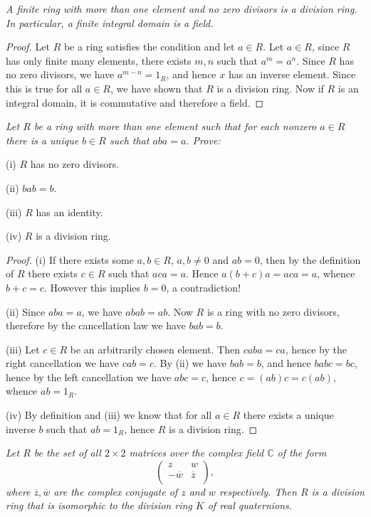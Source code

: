 \begin{problem}\em
A finite ring with more than one element and no zero divisors is a division ring. In particular, a finite integral domain is a field.
\end{problem}
\begin{proof}
Let $R$ be a ring satisfies the condition and let $a\in R$. Let $a\in R$, since $R$ has only finite many elements, there exists $m,n$ such that $a^m=a^n$. Since $R$ has no zero divisors, we have $a^{m-n}=1_R$, and hence $x$ has an inverse element. Since this is true for all $a\in R$, we have shown that $R$ is a division ring. Now if $R$ is an integral domain, it is commutative and therefore a field.
\end{proof}
\begin{problem}\em
Let $R$ be a ring with more than one element such that for each nonzero $a\in R$ there is a unique $b\in R$ such that $aba=a$. Prove:\par
(i) $R$ has no zero divisors.\par
(ii) $bab=b$.\par
(iii) $R$ has an identity.\par
(iv) $R$ is a division ring.
\end{problem}
\begin{proof}
(i) If there exists some $a,b\in R$, $a,b\ne 0$ and $ab=0$, then by the definition of $R$ there exists $c\in R$ such that $aca=a$. Hence $a(b+c)a=aca=a$, whence $b+c=c$. However this implies $b=0$, a contradiction!\par
(ii) Since $aba=a$, we have $abab=ab$. Now $R$ is a ring with no zero divisors, therefore by the cancellation law we have $bab=b$.\par
(iii) Let $c\in R$ be an arbitrarily chosen element. Then $caba=ca$, hence by the right cancellation we have $cab=c$. By (ii) we have $bab=b$, and hence $babc=bc$, hence by the left cancellation we have $abc=c$, hence $c=(ab)c=c(ab)$, whence $ab=1_R$.\par
(iv) By definition and (iii) we know that for all $a\in R$ there exists a unique inverse $b$ such that $ab=1_R$, hence $R$ is a division ring.
\end{proof}
\begin{problem}\em
Let $R$ be the set of all $2\times 2$ matrices over the complex field $\mathbb{C}$ of the form 
$$
\left( \begin{matrix}
	z&		w\\
	-\overline{w}&		\overline{z}\\
\end{matrix} \right) ,
$$
where $\overline{z},\overline{w}$ are the complex conjugate of $z$ and $w$ respectively. Then $R$ is a division ring that is isomorphic to the division ring $K$ of real quaternions.
\end{problem}
